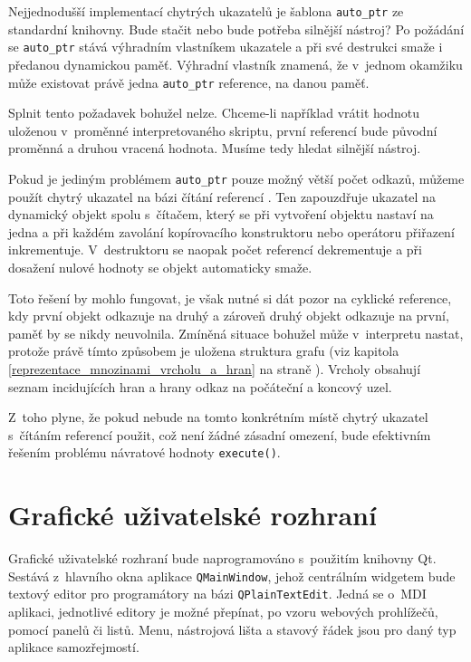 \documentclass[11pt,twoside,a4paper]{book}
\begin{document}
Nejjednodušší implementací chytrých ukazatelů je šablona \texttt{auto\_ptr} ze standardní kni\-hov\-ny. Bude stačit nebo bude potřeba silnější nástroj? Po požádání se \texttt{auto\_ptr} stává výhradním vlastníkem ukazatele a při své destrukci smaže i předanou dynamickou paměť. Výhradní vlastník znamená, že v~jednom okamžiku může existovat právě jedna \texttt{auto\_ptr} reference, na danou paměť.

Splnit tento požadavek bohužel nelze. Chceme-li například vrátit hodnotu uloženou v~pro\-měn\-né interpretovaného skriptu, první referencí bude původní proměnná a druhou vracená hodnota. Musíme tedy hledat silnější nástroj.

Pokud je jediným problémem \texttt{auto\_ptr} pouze možný větší počet odkazů, můžeme použít chytrý ukazatel na bázi čítání referencí \cite{smartp}. Ten zapouzdřuje ukazatel na dynamický objekt spolu s~čítačem, který se při vytvoření objektu nastaví na jedna a při každém zavolání kopírovacího konstruktoru nebo operátoru přiřazení inkrementuje. V~destruktoru se naopak počet referencí dekrementuje a při dosažení nulové hodnoty se objekt automaticky smaže.

Toto řešení by mohlo fungovat, je však nutné si dát pozor na cyklické reference, kdy první objekt odkazuje na druhý a zároveň druhý objekt odkazuje na první, paměť by se nikdy neuvolnila. Zmíněná situace bohužel může v~interpretu nastat, protože právě tímto způsobem je uložena struktura grafu (viz kapitola \ref{reprezentace_mnozinami_vrcholu_a_hran} na straně \pageref{reprezentace_mnozinami_vrcholu_a_hran}). Vrcholy obsahují seznam incidujících hran a hrany odkaz na počáteční a koncový uzel.

Z~toho plyne, že pokud nebude na tomto konkrétním místě chytrý ukazatel s~čítáním referencí použit, což není žádné zásadní omezení, bude efektivním řešením problému návratové hodnoty \texttt{execute()}.


\section{Grafické uživatelské rozhraní}

Grafické uživatelské rozhraní bude naprogramováno s~použitím knihovny Qt. Sestává z~hlav\-ní\-ho okna aplikace \texttt{QMainWindow}, jehož centrálním widgetem bude textový editor pro programátory na bázi \texttt{QPlainTextEdit}. Jedná se o~MDI aplikaci, jednotlivé editory je možné přepínat, po vzoru webových prohlížečů, pomocí panelů či listů. Menu, nástrojová lišta a stavový řádek jsou pro daný typ aplikace samozřejmostí.
\end{document}
